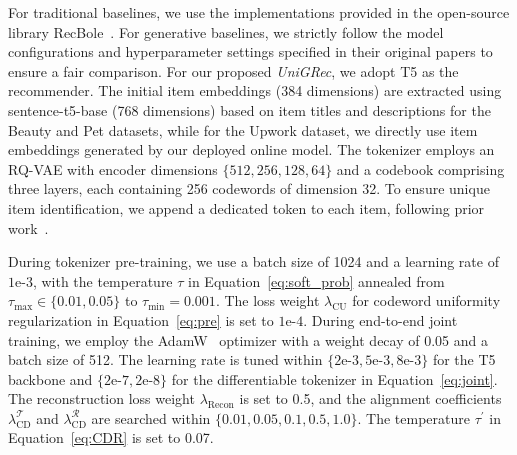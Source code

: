 For traditional baselines, we use the implementations provided in the open-source library RecBole~\cite{recbole}. For generative baselines, we strictly follow the model configurations and hyperparameter settings specified in their original papers to ensure a fair comparison. For our proposed \textit{UniGRec}, we adopt T5 as the recommender. The initial item embeddings (384 dimensions) are extracted using {sentence-t5-base} (768 dimensions) based on item titles and descriptions for the Beauty and Pet datasets, while for the Upwork dataset, we directly use item embeddings generated by our deployed online model. The tokenizer employs an RQ-VAE with encoder dimensions $\{512, 256, 128, 64\}$ and a codebook comprising three layers, each containing 256 codewords of dimension 32. To ensure unique item identification, we append a dedicated token to each item, following prior work~\cite{TIGER,ETEGRec}.

During tokenizer pre-training, we use a batch size of 1024 and a learning rate of $1\text{e-}3$, with the temperature $\tau$ in Equation~\eqref{eq:soft_prob} annealed from $\tau_{\max} \in \{0.01, 0.05\}$ to $\tau_{\min} = 0.001$. The loss weight $\lambda_\text{CU}$ for codeword uniformity regularization in Equation~\eqref{eq:pre} is set to $1\text{e-}4$. During end-to-end joint training, we employ the AdamW~\cite{AdamW} optimizer with a weight decay of 0.05 and a batch size of 512. The learning rate is tuned within $\{2\text{e-}3, 5\text{e-}3, 8\text{e-}3\}$ for the T5 backbone and $\{2\text{e-}7, 2\text{e-}8\}$ for the differentiable tokenizer in Equation~\eqref{eq:joint}. The reconstruction loss weight $\lambda_\text{Recon}$ is set to 0.5, and the alignment coefficients $\lambda_\text{CD}^\mathcal{T}$ and $\lambda_\text{CD}^\mathcal{R}$ are searched within $\{0.01, 0.05, 0.1, 0.5, 1.0\}$. 
The temperature $\tau^\prime$ in Equation~\eqref{eq:CDR} is set to 0.07.

